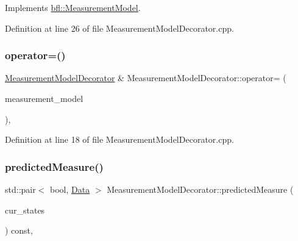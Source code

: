 Implements \mbox{\hyperlink{classbfl_1_1MeasurementModel_ad372b720cef4e6bc0ac2489f4098bfc9}{bfl\+::\+Measurement\+Model}}.



Definition at line 26 of file Measurement\+Model\+Decorator.\+cpp.

\mbox{\label{classbfl_1_1MeasurementModelDecorator_a6878f03475e8bb85719af07e5313f665}} 
\subsubsection{\texorpdfstring{operator=()}{operator=()}}
{\footnotesize\ttfamily \mbox{\hyperlink{classbfl_1_1MeasurementModelDecorator}{Measurement\+Model\+Decorator}} \& Measurement\+Model\+Decorator\+::operator= (\begin{DoxyParamCaption}\item[{\mbox{\hyperlink{classbfl_1_1MeasurementModelDecorator}{Measurement\+Model\+Decorator}} \&\&}]{measurement\+\_\+model }\end{DoxyParamCaption})\hspace{0.3cm}{\ttfamily [protected]}, {\ttfamily [noexcept]}}



Definition at line 18 of file Measurement\+Model\+Decorator.\+cpp.

\mbox{\label{classbfl_1_1MeasurementModelDecorator_ae4b5f665c511cb0fddaaf0a3de402f22}} 
\subsubsection{\texorpdfstring{predicted\+Measure()}{predictedMeasure()}}
{\footnotesize\ttfamily std\+::pair$<$ bool, \mbox{\hyperlink{namespacebfl_af6b103c6821db1b54452f776fdd9dd02}{Data}} $>$ Measurement\+Model\+Decorator\+::predicted\+Measure (\begin{DoxyParamCaption}\item[{const Eigen\+::\+Ref$<$ const Eigen\+::\+Matrix\+Xd $>$ \&}]{cur\+\_\+states }\end{DoxyParamCaption}) const\hspace{0.3cm}{\ttfamily [override]}, {\ttfamily [virtual]}}



